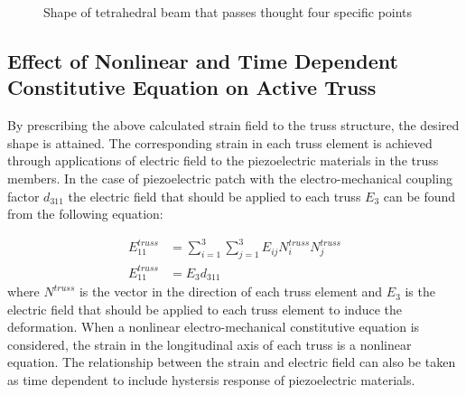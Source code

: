 \begin{figure}
\centering
{}
\caption{Shape of tetrahedral beam that passes thought four specific points}
\label{fig:tetra_hedral_three_point}
\end{figure}

\subsection{Effect of Nonlinear and Time Dependent Constitutive Equation on Active Truss}
By prescribing the above calculated strain field to the truss structure, the desired shape is attained. The corresponding strain in each truss element is achieved through applications of electric field to the piezoelectric materials in the truss members.
In the case of piezoelectric patch with the electro-mechanical coupling factor $d_{311}$ the electric field that should be applied to each truss $E_3$ can be found from the following equation:

\begin{equation}
\begin{aligned}
E_{11}^{truss} &=\sum_{i=1}^3 \sum_{j=1}^3 E_{ij}N^{truss}_i N^{truss}_j\\
E_{11}^{truss} &=E_3 d_{311} 
\end{aligned}
\label{electric_field_in_each_truss:eqn}
\end{equation}
where 
$N^{truss}$ is the vector in the direction of each truss element and 
$E_3$ is the electric field that should be applied to each truss element to induce the deformation.
When a nonlinear electro-mechanical constitutive equation is considered, the strain in the longitudinal axis of each truss is a nonlinear equation.
The relationship between the strain and electric field can also be taken as time dependent to include hystersis response of piezoelectric materials.

